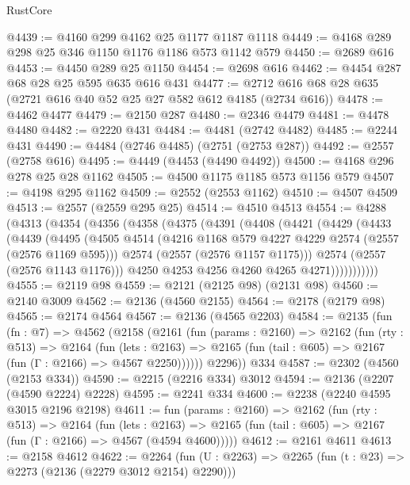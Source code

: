 \begin{lexlean}{RustCore}
\begin{coremodule}
@4439 := @4160 @299 @4162 @25 @1177 @1187 @1118
@4449 := @4168 @289 @298 @25 @346 @1150 @1176 @1186 @573 @1142 @579
@4450 := @2689 @616
@4453 := @4450 @289 @25 @1150
@4454 := @2698 @616
@4462 := @4454 @287 @68 @28 @25 @595 @635 @616 @431
@4477 := @2712 @616 @68 @28 @635 (@2721 @616 @40 @52 @25 @27 @582 @612 @4185 (@2734 @616))
@4478 := @4462 @4477
@4479 := @2150 @287
@4480 := @2346 @4479
@4481 := @4478 @4480
@4482 := @2220 @431
@4484 := @4481 (@2742 @4482)
@4485 := @2244 @431
@4490 := @4484 (@2746 @4485) (@2751 (@2753 @287))
@4492 := @2557 (@2758 @616)
@4495 := @4449 (@4453 (@4490 @4492))
@4500 := @4168 @296 @278 @25 @28 @1162
@4505 := @4500 @1175 @1185 @573 @1156 @579
@4507 := @4198 @295 @1162
@4509 := @2552 (@2553 @1162)
@4510 := @4507 @4509
@4513 := @2557 (@2559 @295 @25)
@4514 := @4510 @4513
@4554 := @4288
    (@4313
      (@4354
        (@4356
          (@4358
            (@4375
              (@4391
                (@4408
                  (@4421
                    (@4429
                      (@4433
                        (@4439
                          (@4495
                            (@4505
                              @4514
                              (@4216 @1168 @579 @4227 @4229 @2574 (@2557 (@2576 @1169 @595)))
                              @2574
                              (@2557 (@2576 @1157 @1175)))
                            @2574
                            (@2557 (@2576 @1143 @1176)))
                          @4250
                          @4253
                          @4256
                          @4260
                          @4265
                          @4271)))))))))))
@4555 := @2119 @98
@4559 := @2121 (@2125 @98) (@2131 @98)
@4560 := @2140 @3009
@4562 := @2136 (@4560 @2155)
@4564 := @2178 (@2179 @98)
@4565 := @2174 @4564
@4567 := @2136 (@4565 @2203)
@4584 := @2135
    (fun (fn : @7) =>
    @4562
      (@2158
        (@2161
          (fun (params : @2160) =>
          @2162
            (fun (rty : @513) =>
            @2164
              (fun (lets : @2163) =>
              @2165 (fun (tail : @605) => @2167 (fun (Γ : @2166) => @4567 @2250))))))
        @2296))
    @334
@4587 := @2302 (@4560 (@2153 @334))
@4590 := @2215 (@2216 @334) @3012
@4594 := @2136 (@2207 (@4590 @2224) @2228)
@4595 := @2241 @334
@4600 := @2238 (@2240 @4595 @3015 @2196 @2198)
@4611 := fun (params : @2160) =>
  @2162
    (fun (rty : @513) =>
    @2164
      (fun (lets : @2163) =>
      @2165 (fun (tail : @605) => @2167 (fun (Γ : @2166) => @4567 (@4594 @4600)))))
@4612 := @2161 @4611
@4613 := @2158 @4612
@4622 := @2264 (fun (U : @2263) => @2265 (fun (t : @23) => @2273 (@2136 (@2279 @3012 @2154) @2290)))

\end{coremodule}
\end{lexlean}
